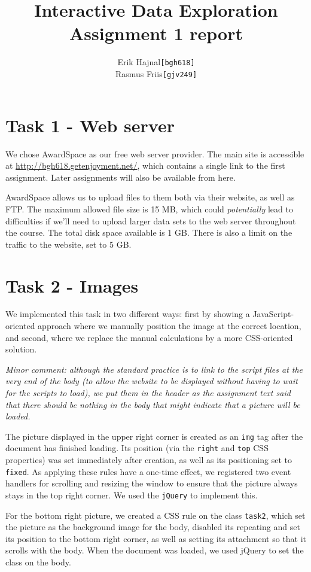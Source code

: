 \documentclass[a4paper]{article}
\title{Interactive Data Exploration\\
	Assignment 1 report}
\author{
    \begin{tabular}{r l}
        Erik Hajnal & \texttt{[bgh618]} \\
        Rasmus Friis & \texttt{[gjv249]}
    \end{tabular}
}
\begin{document}
\maketitle
\pagebreak

\section*{Task 1 - Web server}

We chose AwardSpace as our free web server provider. The main site is accessible at \url{http://bgh618.getenjoyment.net/}, which contains a single link to the first assignment. Later assignments will also be available from here.

AwardSpace allows us to upload files to them both via their website, as well as FTP. The maximum allowed file size is 15 MB, which could \textit{potentially} lead to difficulties if we'll need to upload larger data sets to the web server throughout the course. The total disk space available is 1 GB. There is also a limit on the traffic to the website, set to 5 GB.

\section*{Task 2 - Images}

We implemented this task in two different ways: first by showing a JavaScript-oriented approach where we manually position the image at the correct location, and second, where we replace the manual calculations by a more CSS-oriented solution.

\textit{Minor comment: although the standard practice is to link to the script files at the very end of the body (to allow the website to be displayed without having to wait for the scripts to load), we put them in the header as the assignment text said that there should be nothing in the body that might indicate that a picture will be loaded.}

The picture displayed in the upper right corner is created as an \texttt{img} tag after the document has finished loading. Its position (via the \texttt{right} and \texttt{top} CSS properties) was set immediately after creation, as well as its positioning set to \texttt{fixed}. As applying these rules have a one-time effect, we registered two event handlers for scrolling and resizing the window to ensure that the picture always stays in the top right corner. We used the \texttt{jQuery} to implement this.

For the bottom right picture, we created a CSS rule on the class \texttt{task2}, which set the picture as the background image for the body, disabled its repeating and set its position to the bottom right corner, as well as setting its attachment so that it scrolls with the body. When the document was loaded, we used jQuery to set the class on the body.
\end{document}

